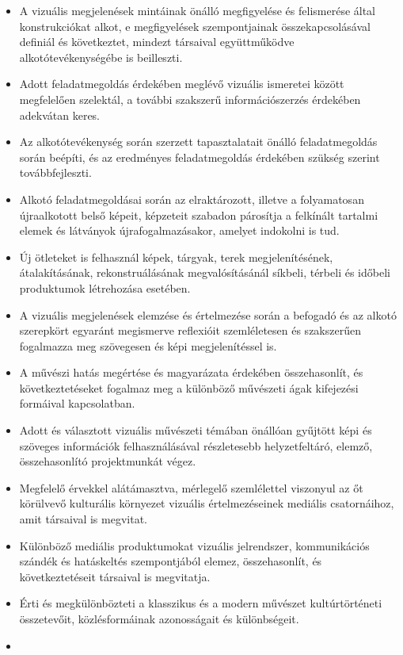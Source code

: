 \begin{itemize}
\item
  A vizuális megjelenések mintáinak önálló megfigyelése és felismerése
  által konstrukciókat alkot, e megfigyelések szempontjainak
  összekapcsolásával definiál és következtet, mindezt társaival
  együttműködve alkotótevékenységébe is beilleszti.
\item
  Adott feladatmegoldás érdekében meglévő vizuális ismeretei között
  megfelelően szelektál, a további szakszerű információszerzés érdekében
  adekvátan keres.
\item
  Az alkotótevékenység során szerzett tapasztalatait önálló
  feladatmegoldás során beépíti, és az eredményes feladatmegoldás
  érdekében szükség szerint továbbfejleszti.
\item
  Alkotó feladatmegoldásai során az elraktározott, illetve a
  folyamatosan újraalkotott belső képeit, képzeteit szabadon párosítja a
  felkínált tartalmi elemek és látványok újrafogalmazásakor, amelyet
  indokolni is tud.
\item
  Új ötleteket is felhasznál képek, tárgyak, terek megjelenítésének,
  átalakításának, rekonstruálásának megvalósításánál síkbeli, térbeli és
  időbeli produktumok létrehozása esetében.
\item
  A vizuális megjelenések elemzése és értelmezése során a befogadó és az
  alkotó szerepkört egyaránt megismerve reflexióit szemléletesen és
  szakszerűen fogalmazza meg szövegesen és képi megjelenítéssel is.
\item
  A művészi hatás megértése és magyarázata érdekében összehasonlít, és
  következtetéseket fogalmaz meg a különböző művészeti ágak kifejezési
  formáival kapcsolatban.
\item
  Adott és választott vizuális művészeti témában önállóan gyűjtött képi
  és szöveges információk felhasználásával részletesebb helyzetfeltáró,
  elemző, összehasonlító projektmunkát végez.
\item
  Megfelelő érvekkel alátámasztva, mérlegelő szemlélettel viszonyul az
  őt körülvevő kulturális környezet vizuális értelmezéseinek mediális
  csatornáihoz, amit társaival is megvitat.
\item
  Különböző mediális produktumokat vizuális jelrendszer, kommunikációs
  szándék és hatáskeltés szempontjából elemez, összehasonlít, és
  következtetéseit társaival is megvitatja.
\item
  Érti és megkülönbözteti a klasszikus és a modern művészet
  kultúrtörténeti összetevőit, közlésformáinak azonosságait és
  különbségeit.
\item

\end{itemize}
